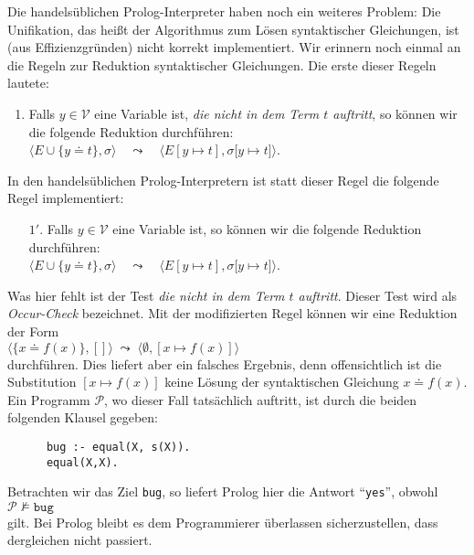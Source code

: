Die handels\"{u}blichen Prolog-Interpreter haben noch ein weiteres Problem: Die Unifikation,
das heißt der Algorithmus zum L\"{o}sen syntaktischer Gleichungen, ist (aus Effizienzgr\"{u}nden)
nicht korrekt implementiert.  Wir erinnern noch einmal an die Regeln zur Reduktion
syntaktischer Gleichungen.  Die erste dieser Regeln lautete:
\begin{enumerate}
\item Falls $y\in\mathcal{V}$ eine Variable ist, {\em die nicht in dem Term $t$ auftritt}, so
      k\"{o}nnen wir die folgende Reduktion durchf\"{u}hren: \\[0.1cm]
      \hspace*{2.1cm} $\Big\langle E \cup \big\{ y \doteq t \big\}, \sigma \Big\rangle \quad\leadsto\quad \Big\langle E[y \mapsto t], \sigma\big[ y \mapsto t \big] \Big\rangle$.
\end{enumerate}
In den handels\"{u}blichen Prolog-Interpretern ist statt dieser Regel die folgende Regel
implementiert:
\begin{enumerate}
\item[$1'$.] Falls $y\in\mathcal{V}$ eine Variable ist, so
      k\"{o}nnen wir die folgende Reduktion durchf\"{u}hren: \\[0.1cm]
      \hspace*{2.1cm} $\Big\langle E \cup \big\{ y \doteq t \big\}, \sigma \Big\rangle \quad\leadsto\quad \Big\langle E[y \mapsto t], \sigma\big[ y \mapsto t \big] \Big\rangle$.
\end{enumerate}
Was hier fehlt ist der Test {\em die nicht in dem Term $t$ auftritt}.  Dieser Test
wird als \emph{Occur-Check} bezeichnet.  Mit der modifizierten Regel k\"{o}nnen wir eine
Reduktion der Form
\\[0.1cm]
\hspace*{1.3cm} $\langle \{ x \doteq f(x) \}, [] \rangle \;\leadsto\; \langle \emptyset, [ x \mapsto f(x) ] \rangle$ \\[0.1cm]
durchf\"{u}hren.  Dies liefert aber ein falsches Ergebnis, denn offensichtlich ist die Substitution 
$[x \mapsto f(x)]$ keine L\"{o}sung der syntaktischen Gleichung $x \doteq f(x)$.  
Ein  Programm $\mathcal{P}$, wo dieser Fall tats\"{a}chlich auftritt, ist durch die beiden folgenden Klausel gegeben: 
\begin{verbatim}
      bug :- equal(X, s(X)).
      equal(X,X).
\end{verbatim}
Betrachten wir das Ziel \texttt{bug}, so liefert Prolog hier die Antwort ``\texttt{yes}'', obwohl \\[0.1cm]
\hspace*{1.3cm} $\mathcal{P} \not\models \mathtt{bug}$ \\[0.1cm]
gilt.
Bei Prolog bleibt es dem Programmierer \"{u}berlassen sicherzustellen, dass dergleichen nicht 
passiert.

